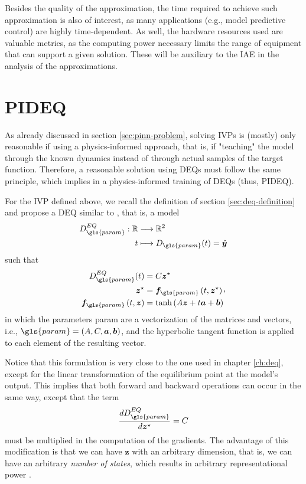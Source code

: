 Besides the quality of the approximation, the time required to achieve such approximation is also of interest, as many applications (e.g., model predictive control) are highly time-dependent.
As well, the hardware resources used are valuable metrics, as the computing power necessary limits the range of equipment that can support a given solution.
These will be auxiliary to the \gls{IAE} in the analysis of the approximations.

\section{PIDEQ}

As already discussed in section \ref{sec:pinn-problem}, solving \gls{IVP}s is (mostly) only reasonable if using a physics-informed approach, that is, if "teaching" the model through the known dynamics instead of through actual samples of the target function.
Therefore, a reasonable solution using \gls{DEQ}s must follow the same principle, which implies in a physics-informed training of \gls{DEQ}s (thus, \gls{PIDEQ}).

For the \gls{IVP} defined above, we recall the definition of section \ref{sec:deq-definition} and propose a \gls{DEQ} similar to \textcite{Ghaoui2019}, that is, a model
\begin{align*}
    D_{\gls{param}}^{EQ}: \R &\longrightarrow \R^2 \\
    t &\longmapsto D_{\gls{param}}(t) = \hat{\bm{y}}
\end{align*}
such that
\begin{equation}
\begin{split}
    D^{EQ}_{\gls{param}}(t) &= C\bm{z}^{\star} \\
    \bm{z}^{\star} &= \bm{f}_{\gls{param}}\left( t,\bm{z}^{\star} \right) \\
    \bm{f}_{\gls{param}}\left( t,\bm{z} \right) &= \tanh \left( A\bm{z} + t\bm{a} + \bm{b} \right)
\end{split}
,\end{equation}
in which the parameters \gls{param} are a vectorization of the matrices and vectors, i.e., $\gls{param} = \left( A,C,\bm{a},\bm{b} \right)$, and the hyperbolic tangent function is applied to each element of the resulting vector.

Notice that this formulation is very close to the one used in chapter \ref{ch:deq}, except for the linear transformation of the equilibrium point at the model's output.
This implies that both forward and backward operations can occur in the same way, except that the term  \[
    \frac{d D^{EQ}_{\gls{param}}}{d \bm{z}^{\star}} = C
\] must be multiplied in the computation of the gradients.
The advantage of this modification is that we can have $\bm{z}$ with an arbitrary dimension, that is, we can have an arbitrary \emph{number of states}, which results in arbitrary representational power \cite{Ghaoui2019}.

